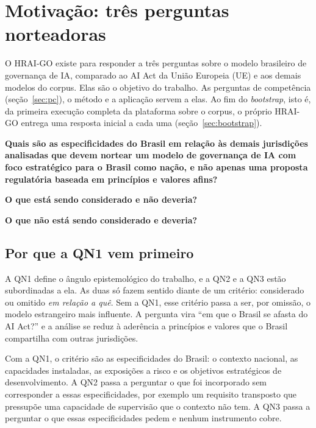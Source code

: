 \documentclass[12pt,a4paper,oneside,english,brazil]{abntex2}
\begin{document}
\chapter{Motivação: três perguntas norteadoras}\label{cap:motivacao}

O HRAI-GO existe para responder a três perguntas sobre o modelo brasileiro de governança de IA, comparado ao AI Act da União Europeia (UE) e aos demais modelos do corpus. Elas são o objetivo do trabalho. As perguntas de competência (seção~\ref{sec:pc}), o método e a aplicação servem a elas. Ao fim do \emph{bootstrap}, isto é, da primeira execução completa da plataforma sobre o corpus, o próprio HRAI-GO entrega uma resposta inicial a cada uma (seção~\ref{sec:bootstrap}).

\begin{description}[style=nextline,leftmargin=12mm,labelindent=0pt]
  \item[QN1] \textbf{Quais são as especificidades do Brasil em relação às demais jurisdições analisadas que devem nortear um modelo de governança de IA com foco estratégico para o Brasil como nação, e não apenas uma proposta regulatória baseada em princípios e valores afins?}
  \item[QN2] \textbf{O que está sendo considerado e não deveria?}
  \item[QN3] \textbf{O que não está sendo considerado e deveria?}
\end{description}

\section{Por que a QN1 vem primeiro}\label{sec:qn1primeiro}

A QN1 define o ângulo epistemológico do trabalho, e a QN2 e a QN3 estão subordinadas a ela. As duas só fazem sentido diante de um critério: considerado ou omitido \emph{em relação a quê}. Sem a QN1, esse critério passa a ser, por omissão, o modelo estrangeiro mais influente. A pergunta vira ``em que o Brasil se afasta do AI Act?'' e a análise se reduz à aderência a princípios e valores que o Brasil compartilha com outras jurisdições.

Com a QN1, o critério são as especificidades do Brasil: o contexto nacional, as capacidades instaladas, as exposições a risco e os objetivos estratégicos de desenvolvimento. A QN2 passa a perguntar o que foi incorporado sem corresponder a essas especificidades, por exemplo um requisito transposto que pressupõe uma capacidade de supervisão que o contexto não tem. A QN3 passa a perguntar o que essas especificidades pedem e nenhum instrumento cobre.
\end{document}
